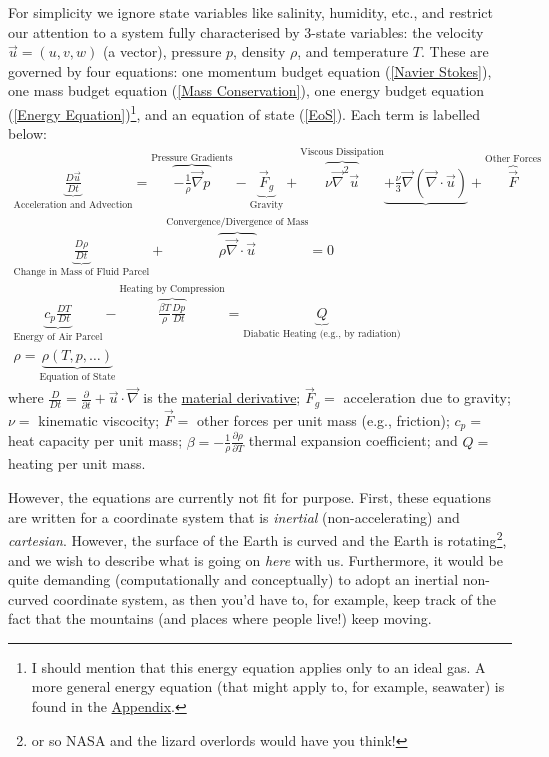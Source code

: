 For simplicity we ignore state variables like salinity, humidity, etc., and restrict our attention to a system fully characterised by 3-state variables: the velocity \(\vec{u}=(u,v,w)\) (a vector), pressure \(p\), density \(\rho\), and temperature \(T\). These are governed by four equations: one momentum budget equation (\ref{Navier Stokes}), one mass budget equation (\ref{Mass Conservation}), one energy budget equation (\ref{Energy Equation})\footnote{
    I should mention that this energy equation applies only to an ideal gas. A more general energy equation (that might apply to, for example, seawater) is found in the \hyperref[Appendix]{Appendix}.
}, and an equation of state (\ref{EoS}). Each term is labelled below:
\begin{gather}
    \boxed{\underbrace{\frac{D\vec{u}}{Dt}}_{\text{Acceleration and Advection}}
    =
    \overbrace{-\frac{1}{\rho}\vec{\nabla}p}^\text{Pressure Gradients}-
    \underbrace{\vec{F}_g}_\text{Gravity}+
    \overbrace{\nu\vec{\nabla}^2\vec{u}}^\text{Viscous Dissipation}
    \underbrace{+\frac{\nu}{3}\vec{\nabla}(\vec{\nabla}\cdot\vec{u})}_\text{}+\overbrace{\vec{F}}^\text{Other Forces}}
    \label{Navier Stokes}
    \\
    \boxed{\underbrace{\frac{D\rho}{Dt}}_\text{Change in Mass of Fluid Parcel}
    +
    \overbrace{\rho\vec{\nabla}\cdot\vec{u}}^\text{Convergence/Divergence of Mass}=0}
    \label{Mass Conservation Intro}
    \\
    \boxed{\underbrace{c_p\frac{DT}{Dt}}_\text{Energy of Air Parcel}-\overbrace{\frac{\beta T}{\rho}\frac{Dp}{Dt}}^\text{Heating by Compression}=\underbrace{Q}_\text{Diabatic Heating (e.g., by radiation)}}
    \label{Energy Equation}
    \\
    \boxed{\rho=\underbrace{\rho(T,p,\ldots)}_{\text{Equation of State}}}
    \label{EoS}
\end{gather}
where \(\frac{D}{Dt}=\frac{\partial}{\partial t}+\vec{u}\cdot\vec{\nabla}\) is the \hyperref[Material Derivative]{material derivative}; \(\vec{F}_g=\) acceleration due to gravity; \(\nu=\) kinematic viscocity; \(\vec{F}=\) other forces per unit mass (e.g., friction); \(c_p=\) heat capacity per unit mass; \(\beta=-\frac{1}{\rho}\frac{\partial \rho}{\partial T}\) thermal expansion coefficient; and \(Q=\) heating per unit mass.

However, the equations are currently not fit for purpose. First, these equations are written for a coordinate system that is \textit{inertial} (non-accelerating) and \textit{cartesian}. However, the surface of the Earth is curved and the Earth is rotating\footnote{or so NASA and the lizard overlords would have you think!}, and we wish to describe what is going on \textit{here} with us. Furthermore, it would be quite demanding (computationally and conceptually) to adopt an inertial non-curved coordinate system, as then you'd have to, for example, keep track of the fact that the mountains (and places where people live!) keep moving. 

